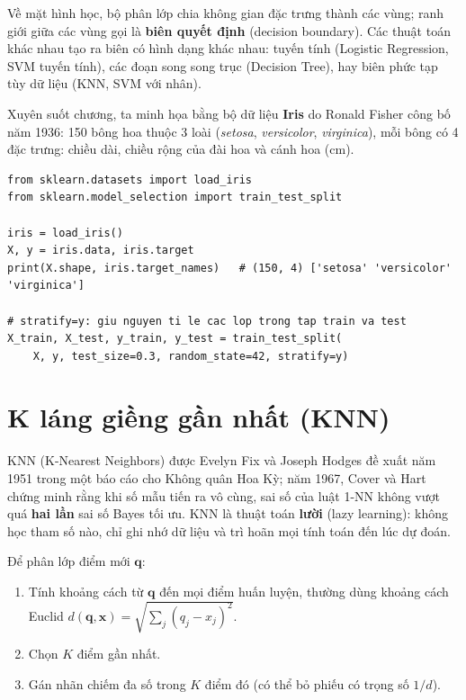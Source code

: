 Về mặt hình học, bộ phân lớp chia không gian đặc trưng thành các vùng; ranh giới giữa các vùng gọi là \textbf{biên quyết định} (decision boundary). Các thuật toán khác nhau tạo ra biên có hình dạng khác nhau: tuyến tính (Logistic Regression, SVM tuyến tính), các đoạn song song trục (Decision Tree), hay biên phức tạp tùy dữ liệu (KNN, SVM với nhân).


Xuyên suốt chương, ta minh họa bằng bộ dữ liệu \textbf{Iris} do Ronald Fisher công bố năm 1936: 150 bông hoa thuộc 3 loài (\textit{setosa}, \textit{versicolor}, \textit{virginica}), mỗi bông có 4 đặc trưng: chiều dài, chiều rộng của đài hoa và cánh hoa (cm).

\begin{lstlisting}[caption={Chuẩn bị dữ liệu Iris}]
from sklearn.datasets import load_iris
from sklearn.model_selection import train_test_split

iris = load_iris()
X, y = iris.data, iris.target
print(X.shape, iris.target_names)   # (150, 4) ['setosa' 'versicolor' 'virginica']

# stratify=y: giu nguyen ti le cac lop trong tap train va test
X_train, X_test, y_train, y_test = train_test_split(
    X, y, test_size=0.3, random_state=42, stratify=y)
\end{lstlisting}

\section{K láng giềng gần nhất (KNN)}

KNN (K-Nearest Neighbors) được Evelyn Fix và Joseph Hodges đề xuất năm 1951 trong một báo cáo cho Không quân Hoa Kỳ; năm 1967, Cover và Hart chứng minh rằng khi số mẫu tiến ra vô cùng, sai số của luật 1-NN không vượt quá \textbf{hai lần} sai số Bayes tối ưu. KNN là thuật toán \textbf{lười} (lazy learning): không học tham số nào, chỉ ghi nhớ dữ liệu và trì hoãn mọi tính toán đến lúc dự đoán.

\begin{definition}
Để phân lớp điểm mới $\mathbf{q}$:
\begin{enumerate}
    \item Tính khoảng cách từ $\mathbf{q}$ đến mọi điểm huấn luyện, thường dùng khoảng cách Euclid $d(\mathbf{q}, \mathbf{x}) = \sqrt{\sum_j (q_j - x_j)^2}$.
    \item Chọn $K$ điểm gần nhất.
    \item Gán nhãn chiếm đa số trong $K$ điểm đó (có thể bỏ phiếu có trọng số $1/d$).
\end{enumerate}
\end{definition}

